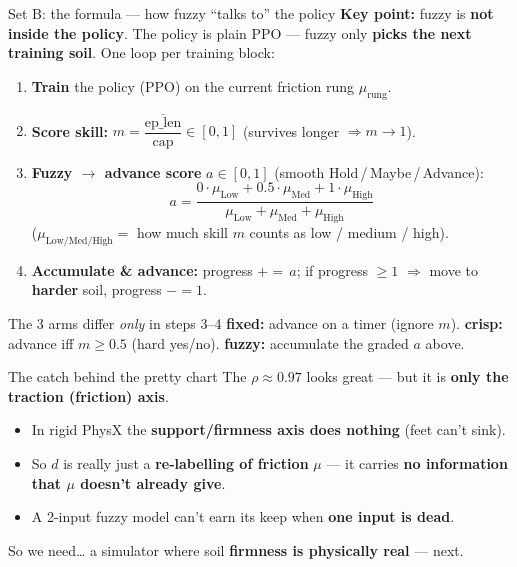 \documentclass[aspectratio=169]{beamer}
\newcommand{\bad}[1]{\textcolor{red!70!black}{\textbf{#1}}}
\begin{document}
\begin{frame}{Set B: the formula --- how fuzzy ``talks to'' the policy}
  \textbf{Key point:} fuzzy is \textbf{not inside the policy}. The policy is plain PPO --- fuzzy only
  \textbf{picks the next training soil}. One loop per training block:
  \vspace{2pt}
  \begin{enumerate}\footnotesize
    \item \textbf{Train} the policy (PPO) on the current friction rung $\mu_{\text{rung}}$.
    \item \textbf{Score skill:} \;$m=\dfrac{\overline{\text{ep\_len}}}{\text{cap}}\in[0,1]$ \quad(survives longer $\Rightarrow m\to1$).
    \item \textbf{Fuzzy $\to$ advance score} $a\in[0,1]$ (smooth Hold\,/\,Maybe\,/\,Advance):
      \[\;a=\frac{0\cdot\mu_{\text{Low}}+0.5\cdot\mu_{\text{Med}}+1\cdot\mu_{\text{High}}}
              {\mu_{\text{Low}}+\mu_{\text{Med}}+\mu_{\text{High}}}\;\]
      \vspace{-2pt}\scriptsize ($\mu_{\text{Low/Med/High}}=$ how much skill $m$ counts as low / medium / high).
    \item \footnotesize \textbf{Accumulate \& advance:} progress $\mathrel{+}{=}\,a$; \;if progress $\ge 1$
      $\Rightarrow$ move to \textbf{harder} soil, progress $\mathrel{-}{=}1$.
  \end{enumerate}
  \begin{block}{The 3 arms differ \textit{only} in steps 3--4}
    \footnotesize \textbf{fixed:} advance on a timer (ignore $m$). \;\;
    \textbf{crisp:} advance iff $m\ge0.5$ (hard yes/no). \;\;
    \textbf{fuzzy:} accumulate the graded $a$ above.
  \end{block}
\end{frame}

\begin{frame}{The catch behind the pretty chart}
  The $\rho\approx0.97$ looks great --- but it is \textbf{only the traction (friction) axis}.
  \begin{itemize}
    \item In rigid PhysX the \textbf{support/firmness axis does nothing} (feet can't sink).
    \item So $d$ is really just a \textbf{re-labelling of friction} $\mu$ --- it carries
          \bad{no information that $\mu$ doesn't already give}.
    \item A 2-input fuzzy model can't earn its keep when \textbf{one input is dead}.
  \end{itemize}
  \begin{block}{So we need\dots}
    a simulator where soil \textbf{firmness is physically real} --- next.
  \end{block}
\end{frame}
\end{document}
